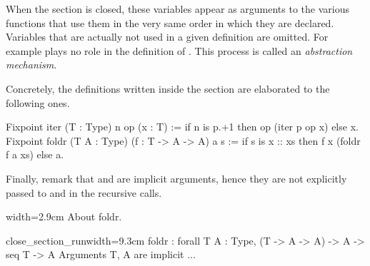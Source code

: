 When
the section is closed, these variables appear as arguments to
the various functions that use them in the very same
order in which they are declared.  
Variables that are actually
not used in a given definition are omitted. For example  plays no
role in the definition of .
This process %
is called
an {\em abstraction mechanism}.


Concretely, the definitions written inside the section are 
elaborated to the following ones.

\begin{coq}{}{}
Fixpoint iter (T : Type) n op (x : T) :=
  if n is p.+1 then op (iter p op x) else x.
Fixpoint foldr (T A : Type) (f : T -> A -> A) a s :=
  if s is x :: xs then f x (foldr f a xs) else a.
\end{coq}

Finally, remark that  and  are implicit arguments, hence they
are not explicitly passed to  and  in the recursive calls.

\begin{coq}{}{width=2.9cm}
About foldr.
$~$
\end{coq}
\begin{coqout}{close_section_run}{width=9.3cm}
foldr : forall T A : Type, (T -> A -> A) -> A -> seq T -> A
Arguments T, A are implicit ...
\end{coqout}


